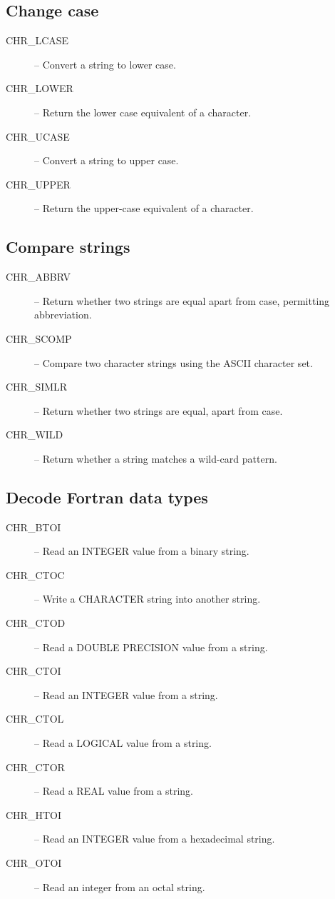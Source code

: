 \documentclass[twoside,11pt,nolof]{starlink}
\begin{document}
\subsection {Change case}

\begin {description}
\item [CHR\_LCASE] -- Convert a string to lower case.
\item [CHR\_LOWER] -- Return the lower case equivalent of a character.
\item [CHR\_UCASE] -- Convert a string to upper case.
\item [CHR\_UPPER] -- Return the upper-case equivalent of a character.
\end {description}


\subsection {Compare strings}

\begin {description}
\item [CHR\_ABBRV] -- Return whether two strings are equal apart from case,
permitting  abbreviation.
\item [CHR\_SCOMP] -- Compare two character strings using the ASCII character
set.
\item [CHR\_SIMLR] -- Return whether two strings are equal, apart from case.
\item [CHR\_WILD] -- Return whether a string matches a wild-card pattern.
\end {description}


\subsection {Decode Fortran data types}

\begin {description}
\item [CHR\_BTOI] -- Read an INTEGER value from a binary string.
\item [CHR\_CTOC] -- Write a CHARACTER string into another string.
\item [CHR\_CTOD] -- Read a DOUBLE PRECISION value from a string.
\item [CHR\_CTOI] -- Read an INTEGER value from a string.
\item [CHR\_CTOL] -- Read a LOGICAL value from a string.
\item [CHR\_CTOR] -- Read a REAL value from a string.
\item [CHR\_HTOI] -- Read an INTEGER value from a hexadecimal string.
\item [CHR\_OTOI] -- Read an integer from an octal string.
\end {description}
\end{document}
